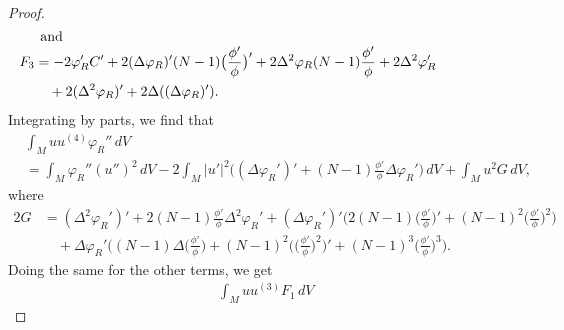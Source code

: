\documentclass[10pt,leqno]{amsart}
\numberwithin{equation}{section}
\begin{document}
\begin{proof}
\begin{align*}
\noalign{and}
F_3 &= -2\varphi_R' C' +2(\Delta \varphi_R)' (N-1) \big(\frac{\phi'}{\phi}\big)' +2 \Delta^2 \varphi_R (N-1)\frac{\phi'}{\phi}+2\Delta^2 \varphi_R' \\
&\quad +2 (\Delta^2 \varphi_R)'  +2 \Delta ( (\Delta \varphi_R)' ).
\end{align*}
Integrating by parts, we find that
\begin{align*}
&\int_M u u^{(4)} \varphi_R ''\, dV\\
&= \int_M \varphi_R ''( u'')^2\, dV - 2\int_M |u'|^2 \big((\Delta \varphi_R')' +(N-1)\frac{\phi'}{\phi} \Delta \varphi_R' \big)\, dV+ \int_M u^2 G\, dV,
\end{align*}
where
\begin{align*}
2G&= (\Delta^2 \varphi_R')' + 2(N-1) \frac{\phi'}{\phi}\Delta^2 \varphi_R' + (\Delta \varphi_R')' \big(2(N-1) \big(\frac{\phi'}{\phi}\big)' + (N-1)^2 \big(\frac{\phi'}{\phi}\big)^2 \big)\\
&\quad + \Delta \varphi_R' \big((N-1) \Delta \big(\frac{\phi'}{\phi}\big) +(N-1)^2 \big(\big(\frac{\phi'}{\phi}\big)^2\big)' + (N-1)^3 \big(\frac{\phi'}{\phi}\big)^3 \big).
\end{align*}
Doing the same for the other terms, we get
\begin{align*}
&\int_M u u^{(3)} F_1\, dV

\end{align*}
\end{proof}
\end{document}
